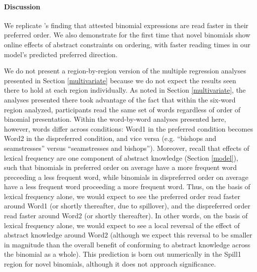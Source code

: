 \documentclass[authoryear]{elsarticle}
\begin{document}
\paragraph{Discussion}
We replicate \citeauthor{SiyanovaChanturia:2011ep}'s \citeyearpar{SiyanovaChanturia:2011ep} finding that attested binomial expressions are read faster in their preferred order. We also demonstrate for the first time that novel binomials show online effects of abstract constraints on ordering, with faster reading times in our model's predicted preferred direction.

We do not present a region-by-region version of the multiple regression analyses presented in Section \ref{multivariate} because we do not expect the results seen there to hold at each region individually. As noted in Section \ref{multivariate}, the analyses presented there took advantage of the fact that within the six-word region analyzed, participants read the same set of words regardless of order of binomial presentation. Within the word-by-word analyses presented here, however, words differ across conditions: Word1 in the preferred condition becomes Word2 in the dispreferred condition, and vice versa (e.g. ``bishops and seamstresses'' versus ``seamstresses and bishops''). Moreover, recall that effects of lexical frequency are one component of abstract knowledge (Section \ref{model}), such that binomials in preferred order on average have a more frequent word preceeding a less frequent word, while binomials in dispreferred order on average have a less frequent word proceeding a more frequent word. Thus, on the basis of lexical frequency alone, we would expect to see the preferred order read faster around Word1 (or shortly thereafter, due to spillover), and the dispreferred order read faster around Word2 (or shortly thereafter). In other words, on the basis of lexical frequency alone, we would expect to see a local reversal of the effect of abstract knowledge around Word2 (although we expect this reversal to be smaller in magnitude than the overall benefit of conforming to abstract knowledge across the binomial as a whole). This prediction is born out numerically in the Spill1 region for novel binomials, although it does not approach significance.

%
\end{document}
